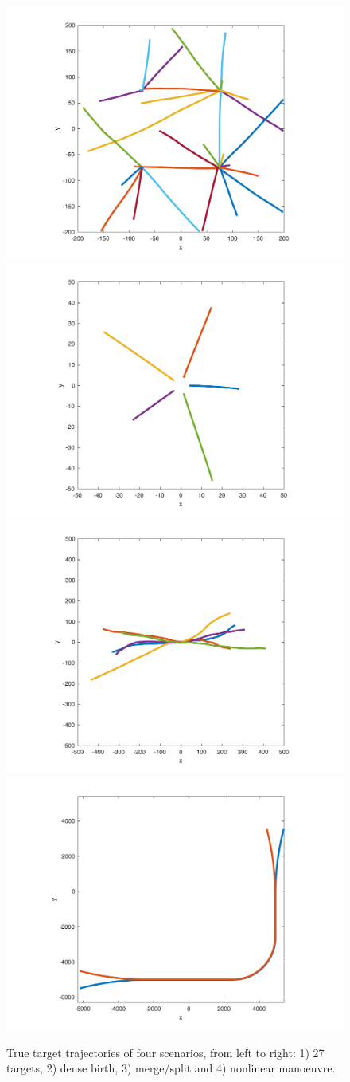 \documentclass[journal]{IEEEtran}
\begin{document}
\begin{figure}[!t]
\centering
\includegraphics[width=0.24\columnwidth]{trajectory1copy.pdf}
\includegraphics[width =0.24 \columnwidth]{trajectory2copy.pdf}
\includegraphics[width =0.24 \columnwidth]{trajectory3copy.pdf}
\includegraphics[width =0.24 \columnwidth]{trajectory4copy.pdf}
\caption{True target trajectories of four scenarios, from left to right: 1) 27 targets, 2) dense birth, 3) merge/split and 4) nonlinear manoeuvre.}
\label{fig:trajectory}
\end{figure}
\end{document}
